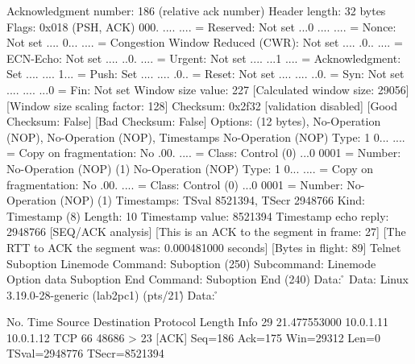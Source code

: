     Acknowledgment number: 186    (relative ack number)
    Header length: 32 bytes
    Flags: 0x018 (PSH, ACK)
        000. .... .... = Reserved: Not set
        ...0 .... .... = Nonce: Not set
        .... 0... .... = Congestion Window Reduced (CWR): Not set
        .... .0.. .... = ECN-Echo: Not set
        .... ..0. .... = Urgent: Not set
        .... ...1 .... = Acknowledgment: Set
        .... .... 1... = Push: Set
        .... .... .0.. = Reset: Not set
        .... .... ..0. = Syn: Not set
        .... .... ...0 = Fin: Not set
    Window size value: 227
    [Calculated window size: 29056]
    [Window size scaling factor: 128]
    Checksum: 0x2f32 [validation disabled]
        [Good Checksum: False]
        [Bad Checksum: False]
    Options: (12 bytes), No-Operation (NOP), No-Operation (NOP), Timestamps
        No-Operation (NOP)
            Type: 1
                0... .... = Copy on fragmentation: No
                .00. .... = Class: Control (0)
                ...0 0001 = Number: No-Operation (NOP) (1)
        No-Operation (NOP)
            Type: 1
                0... .... = Copy on fragmentation: No
                .00. .... = Class: Control (0)
                ...0 0001 = Number: No-Operation (NOP) (1)
        Timestamps: TSval 8521394, TSecr 2948766
            Kind: Timestamp (8)
            Length: 10
            Timestamp value: 8521394
            Timestamp echo reply: 2948766
    [SEQ/ACK analysis]
        [This is an ACK to the segment in frame: 27]
        [The RTT to ACK the segment was: 0.000481000 seconds]
        [Bytes in flight: 89]
Telnet
    Suboption Linemode
        Command: Suboption (250)
        Subcommand: Linemode
            Option data
    Suboption End
        Command: Suboption End (240)
    Data: \r\n
    Data: Linux 3.19.0-28-generic (lab2pc1) (pts/21)\r\n
    Data: \r\n

No.     Time           Source                Destination           Protocol Length Info
     29 21.477553000   10.0.1.11             10.0.1.12             TCP      66     48686 > 23 [ACK] Seq=186 Ack=175 Win=29312 Len=0 TSval=2948776 TSecr=8521394

